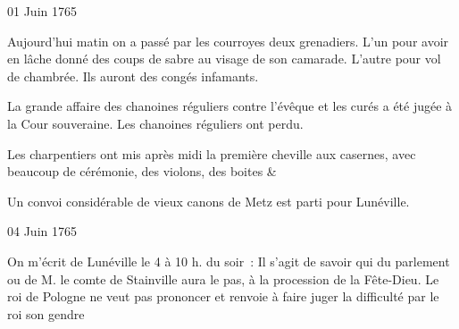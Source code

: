                      \begin{diary}{01 Juin 1765}{}
                        
                         Aujourd'hui matin on a passé par les
                           courroyes deux
                              grenadiers. L'un pour avoir
                           en lâche donné des coups de sabre au visage
                           de son camarade. L'autre pour vol de chambrée.
                           Ils auront des congés infamants. \bigskip
        
        
                         La grande affaire des chanoines
                              réguliers
                           contre l'évêque et les curés a été jugée à
                           la Cour souveraine. Les chanoines réguliers ont perdu. \bigskip
        
        
                         Les charpentiers ont mis après midi la
                           première cheville aux
                              casernes, avec beaucoup
                           de cérémonie, des violons, des boites & \bigskip
        
        
                         Un convoi considérable de vieux
                           canons de
                           Metz est parti pour Lunéville. \bigskip
        
        
                     \end{diary}

                     \begin{diary}{04 Juin 1765}{}
                        
                         On m'écrit de Lunéville
                           le 4 à 10 h. du soir :
                           Il s'agit de savoir qui du parlement ou de M.
                              le comte de Stainville aura le pas, à la procession
                           de la Fête-Dieu. Le roi de Pologne ne veut pas
                           prononcer et renvoie à faire juger la difficulté
                           par le roi son gendre
                        \bigskip
        
        
                     \end{diary}

